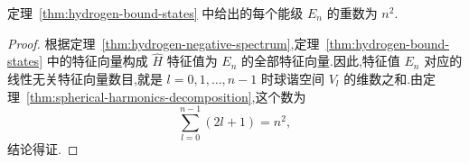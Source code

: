 {\begin{corollary}[氢原子能级的简并度]\label{cor:hydrogen-energy-multiplicity}
定理~\ref{thm:hydrogen-bound-states} 中给出的每个能级 $E_n$ 的重数为 $n^2$.
\end{corollary}

\begin{proof}
根据定理~\ref{thm:hydrogen-negative-spectrum},定理~\ref{thm:hydrogen-bound-states} 中的特征向量构成 $\widehat H$ 特征值为 $E_n$ 的全部特征向量.因此,特征值 $E_n$ 对应的线性无关特征向量数目,就是 $l=0,1,\ldots,n-1$ 时球谐空间 $V_l$ 的维数之和.由定理~\ref{thm:spherical-harmonics-decomposition},这个数为
\[
 \sum_{l=0}^{n-1}(2l+1)=n^2,
\]
结论得证.
\end{proof}
}

\ChapterEighteenRadialRemainder
\ChapterEighteenHydrogen
\ChapterEighteenClassical
\ChapterEighteenQuantumRungeLenz
\ChapterEighteenSOFourSpin
\ChapterEighteenComputations
\ChapterEighteenLateCalculations
\ChapterEighteenExercises
